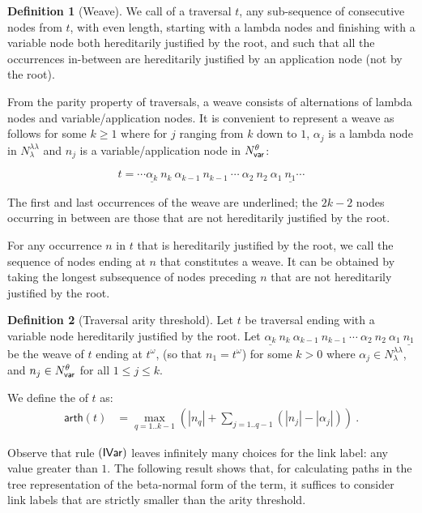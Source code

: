 \documentclass{article}
\theoremstyle{definition}
\newtheorem{definition}{Definition}[section]
\newcommand\NodesVar{N_{\sf var}}%
\newcommand\NodesLmd{N_\lambda}%
\newcommand{\ghostlmd}{{\lambda\!\!\lambda}}
\newcommand{\ghostvar}{\theta}
\newcommand\arth{\textsf{arth}}
\begin{document}
\begin{definition}[Weave]
We call  of a traversal $t$, any sub-sequence of consecutive nodes from $t$,
with even length, starting with a lambda nodes and finishing with a variable node both hereditarily justified by the root, and such that all the occurrences in-between are hereditarily justified by an application node (\ie not by the root).

From the parity property of traversals, a weave consists of alternations of lambda nodes and variable/application nodes. It is convenient to represent a weave as follows for some $k\geq 1$ where for $j$ ranging from $k$ down to $1$, $\alpha_j$ is a lambda node in $\NodesLmd^\ghostlmd$ and $n_j$ is a variable/application node in $\NodesVar^\ghostvar$:

$$ t = \cdots \underline{\alpha_k}\ n_k\ \alpha_{k-1}\ n_{k-1}\ \cdots\ \alpha_2\ n_2\ \alpha_1\ \underline{n_1} \cdots $$

The first and last occurrences of the weave are underlined; the $2k-2$ nodes occurring in between are those that are not hereditarily justified by the root.

For any occurrence $n$ in $t$ that is hereditarily justified by the root, we call  the sequence of nodes ending at $n$ that constitutes a weave. It can be obtained by taking the longest subsequence of nodes preceding $n$ that are not hereditarily justified by the root.
\end{definition}

\begin{definition}[Traversal arity threshold]
\label{dfn:arity-threshold}
Let $t$ be traversal ending with a variable node hereditarily justified by the root.
Let $\underline{\alpha_k}\ n_k\ \alpha_{k-1}\ n_{k-1}\ \cdots\ \alpha_2\ n_2\ \alpha_1\ \underline{n_1}$ be the weave of $t$ ending at $t^\omega$, (so that $n_1 = t^\omega$) for some $k>0$  where $\alpha_j \in \NodesLmd^\ghostlmd$, and $n_j \in \NodesVar^\ghostvar$ for all $1\leq j\leq k$.

We define the  of $t$ as:
\begin{align*}
\arth(t) &= \max_{q=1..k-1} \left( |n_q| + \sum_{j=1..q-1} (|n_j| - |\alpha_j|) \right)\ .
\end{align*}
\end{definition}

Observe that rule $\mathbf{({\sf IVar})}$ leaves infinitely many choices for the link label: any value greater than $1$. The following result shows that, for calculating paths in the tree representation of the beta-normal form of the term, it suffices to consider link labels that are strictly smaller than the arity threshold.
\end{document}
